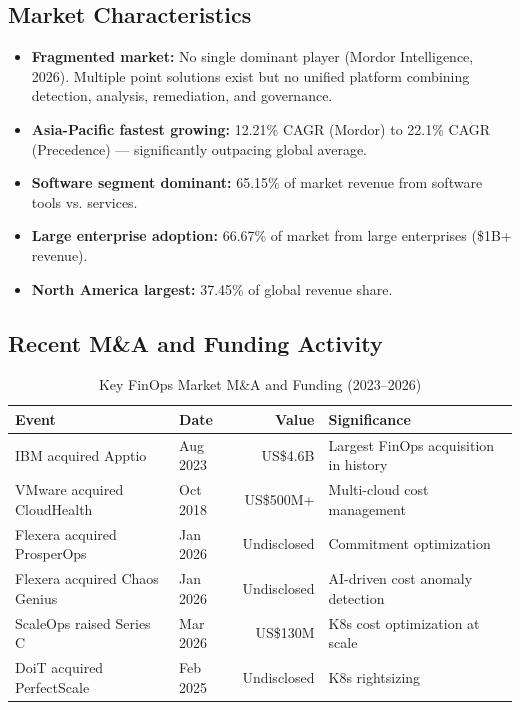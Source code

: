 \documentclass[a4paper,11pt]{article}
\begin{document}
\subsection{Market Characteristics}

\begin{itemize}[itemsep=2mm]
    \item \textbf{Fragmented market:} No single dominant player (Mordor Intelligence, 2026). Multiple point solutions exist but no unified platform combining detection, analysis, remediation, and governance.
    \item \textbf{Asia-Pacific fastest growing:} 12.21\% CAGR (Mordor) to 22.1\% CAGR (Precedence) --- significantly outpacing global average.
    \item \textbf{Software segment dominant:} 65.15\% of market revenue from software tools vs. services.
    \item \textbf{Large enterprise adoption:} 66.67\% of market from large enterprises (\$1B+ revenue).
    \item \textbf{North America largest:} 37.45\% of global revenue share.
\end{itemize}

\subsection{Recent M\&A and Funding Activity}

\begin{table}[H]
\centering
\begin{tabularx}{\textwidth}{llrX}
\toprule
\textbf{Event} & \textbf{Date} & \textbf{Value} & \textbf{Significance} \\
\midrule
IBM acquired Apptio & Aug 2023 & US\$4.6B & Largest FinOps acquisition in history \\
VMware acquired CloudHealth & Oct 2018 & US\$500M+ & Multi-cloud cost management \\
Flexera acquired ProsperOps & Jan 2026 & Undisclosed & Commitment optimization \\
Flexera acquired Chaos Genius & Jan 2026 & Undisclosed & AI-driven cost anomaly detection \\
ScaleOps raised Series C & Mar 2026 & US\$130M & K8s cost optimization at scale \\
DoiT acquired PerfectScale & Feb 2025 & Undisclosed & K8s rightsizing \\
\bottomrule
\end{tabularx}
\caption{Key FinOps Market M\&A and Funding (2023--2026)}
\end{table}
\end{document}
